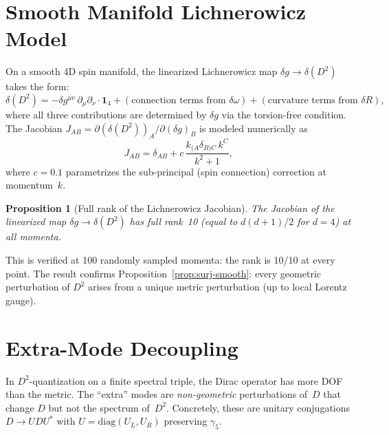 \documentclass[12pt,a4paper]{article}
\newtheorem{proposition}[theorem]{Proposition}
\theoremstyle{definition}
\theoremstyle{remark}
\begin{document}
\section{Smooth Manifold Lichnerowicz Model}
\label{sec:lichnerowicz}

On a smooth 4D spin manifold, the linearized Lichnerowicz map
$\delta g \to \delta(D^2)$ takes the form:
\begin{equation}
  \delta(D^2) = -\delta g^{\mu\nu}\,\partial_\mu\partial_\nu \cdot \mathbf{1}_4
  + (\text{connection terms from } \delta\omega)
  + (\text{curvature terms from } \delta R),
\end{equation}
where all three contributions are determined by $\delta g$ via the
torsion-free condition.  The Jacobian
$J_{AB} = \partial(\delta(D^2))_A / \partial(\delta g)_B$ is modeled
numerically as
\begin{equation}
  J_{AB} = \delta_{AB} + c\,\frac{k_{(A}\delta_{B)C}\,k^C}{k^2 + 1},
\end{equation}
where $c = 0.1$ parametrizes the sub-principal (spin connection) correction
at momentum~$k$.

\begin{proposition}[Full rank of the Lichnerowicz Jacobian]
\label{prop:lichnerowicz}
The Jacobian of the linearized map $\delta g \to \delta(D^2)$ has full
rank~10 (equal to $d(d+1)/2$ for $d = 4$) at all momenta.
\end{proposition}

This is verified at 100 randomly sampled momenta: the rank is 10/10 at
every point.  The result confirms Proposition~\ref{prop:surj-smooth}:
every geometric perturbation of $D^2$ arises from a unique metric
perturbation (up to local Lorentz gauge).

\section{Extra-Mode Decoupling}
\label{sec:decoupling}

In $D^2$-quantization on a finite spectral triple, the Dirac operator has
more DOF than the metric.  The ``extra'' modes are \emph{non-geometric}
perturbations of~$D$ that change $D$ but not the spectrum of~$D^2$.
Concretely, these are unitary conjugations $D \to U D U^*$ with
$U = \mathrm{diag}(U_L, U_R)$ preserving $\gamma_5$.
\end{document}
